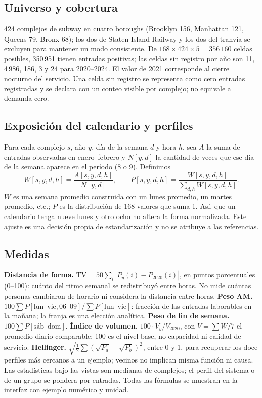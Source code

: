\IfFileExists{IEEEtran.cls}{\documentclass[conference]{IEEEtran}}{\documentclass[10pt,twocolumn]{article}}
\begin{document}
\subsection{Universo y cobertura}

424 complejos de subway en cuatro boroughs (Brooklyn 156, Manhattan 121, Queens 79, Bronx 68); los dos de Staten Island Railway y los dos del tranvía se excluyen para mantener un modo consistente. De $168\times424\times5=356\,160$ celdas posibles, 350\,951 tienen entradas positivas; las celdas sin registro por año son 11, 4\,986, 186, 3 y 24 para 2020--2024. El valor de 2021 corresponde al cierre nocturno del servicio. Una celda sin registro se representa como cero entradas registradas y se declara con un conteo visible por complejo; no equivale a demanda cero.

\subsection{Exposición del calendario y perfiles}

Para cada complejo $s$, año $y$, día de la semana $d$ y hora $h$, sea $A$ la suma de entradas observadas en enero--febrero y $N[y,d]$ la cantidad de veces que ese día de la semana aparece en el período (8 o 9). Definimos
\begin{equation}
W[s,y,d,h]=\frac{A[s,y,d,h]}{N[y,d]},\qquad P[s,y,d,h]=\frac{W[s,y,d,h]}{\sum_{d,h}W[s,y,d,h]}.
\end{equation}
$W$ es una semana promedio construida con un lunes promedio, un martes promedio, etc.; $P$ es la distribución de 168 valores que suma 1. Así, que un calendario tenga nueve lunes y otro ocho no altera la forma normalizada. Este ajuste es una decisión propia de estandarización y no se atribuye a las referencias.

\subsection{Medidas}

\textbf{Distancia de forma.} $\mathrm{TV}=50\sum_i|P_y(i)-P_{2020}(i)|$, en puntos porcentuales (0--100): cuánto del ritmo semanal se redistribuyó entre horas. No mide cuántas personas cambiaron de horario ni considera la distancia entre horas.
\textbf{Peso AM.} $100\sum P[\text{lun--vie},06\text{--}09]/\sum P[\text{lun--vie}]$: fracción de las entradas laborables en la mañana; la franja es una elección analítica.
\textbf{Peso de fin de semana.} $100\sum P[\text{sáb--dom}]$.
\textbf{Índice de volumen.} $100\cdot \bar V_y/\bar V_{2020}$, con $\bar V=\sum W/7$ el promedio diario comparable; 100 es el nivel base, no capacidad ni calidad de servicio.
\textbf{Hellinger.} $\sqrt{\tfrac12\sum(\sqrt{P_a}-\sqrt{P_b})^2}$, entre 0 y 1, para recuperar los doce perfiles más cercanos a un ejemplo; vecinos no implican misma función ni causa.
Las estadísticas bajo las vistas son medianas de complejos; el perfil del sistema o de un grupo se pondera por entradas. Todas las fórmulas se muestran en la interfaz con ejemplo numérico y unidad.
\end{document}
